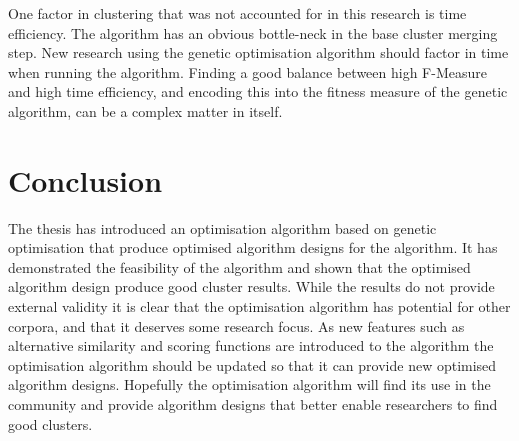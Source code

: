 One factor in clustering that was not accounted for in this research is time efficiency. The \CTC algorithm has an obvious bottle-neck in the base cluster merging step. New research using the genetic optimisation algorithm should factor in time when running the algorithm. Finding a good balance between high F-Measure and high time efficiency, and encoding this into the fitness measure of the genetic algorithm, can be a complex matter in itself.

\section{Conclusion}
The thesis has introduced an optimisation algorithm based on genetic optimisation that produce optimised algorithm designs for the \CTC algorithm. It has demonstrated the feasibility of the algorithm and shown that the optimised algorithm design produce good cluster results. While the results do not provide external validity it is clear that the optimisation algorithm has potential for other corpora, and that it deserves some research focus. As new features such as alternative similarity and scoring functions are introduced to the \CTC algorithm the optimisation algorithm should be updated so that it can provide new optimised algorithm designs. Hopefully the optimisation algorithm will find its use in the community and provide algorithm designs that better enable researchers to find good clusters.